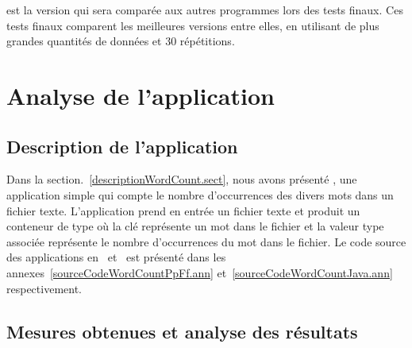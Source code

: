 est la version qui sera compar\'ee aux autres programmes lors des tests finaux. Ces tests finaux comparent les meilleures versions entre elles, en utilisant de plus grandes quantit\'es de donn\'ees et 30 r\'ep\'etitions.


\section{Analyse de l'application }
\label{wordcount.sect}



\subsection{Description de l'application }


Dans la section.~\ref{descriptionWordCount.sect}, nous avons pr\'esent\'e , une application simple qui compte le nombre d'occurrences des divers mots dans un fichier texte. L'application prend en entr\'ee un fichier texte et produit un conteneur de type  où la cl\'e repr\'esente un mot dans le fichier et la valeur  type   associ\'ee repr\'esente le nombre d'occurrences du mot dans le fichier. Le code source des applications  en~ et~ est pr\'esent\'e dans les annexes~\ref{sourceCodeWordCountPpFf.ann} et~\ref{sourceCodeWordCountJava.ann} respectivement.


\subsection{Mesures obtenues et analyse des r\'esultats}




